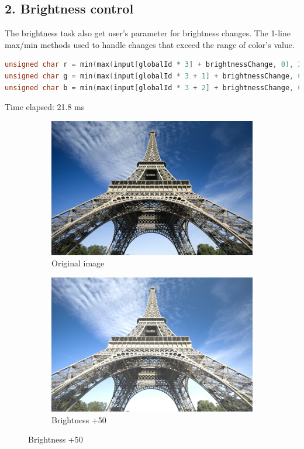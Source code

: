\documentclass[12pt]{article}
\begin{document}
\subsection*{2. Brightness control}

The brightness task also get user's parameter for brightness changes. The 1-line max/min methods used to handle changes that exceed the range of color's value.

\begin{lstlisting}[language=C]
unsigned char r = min(max(input[globalId * 3] + brightnessChange, 0), 255);
unsigned char g = min(max(input[globalId * 3 + 1] + brightnessChange, 0), 255);
unsigned char b = min(max(input[globalId * 3 + 2] + brightnessChange, 0), 255);
\end{lstlisting}

Time elapsed: 21.8 ms

\begin{figure}[H]
  \centering
  \begin{subfigure}{.45\textwidth}
    \includegraphics[width=\linewidth]{./img/origin.jpg}
    \caption{Original image}
  \end{subfigure}
  \hspace{1cm}
  \begin{subfigure}{.45\textwidth}
    \includegraphics[width=\linewidth]{./img/6b.jpg}
    \caption{Brightness +50}
  \end{subfigure}
\end{figure}
\end{document}
